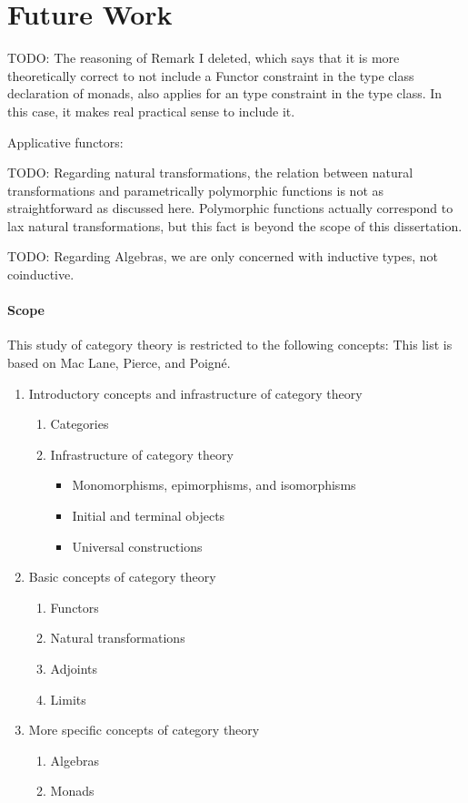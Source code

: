 \section{Future Work}

TODO: The reasoning of Remark I deleted, which says that it is more
theoretically correct to not include a Functor constraint in the type
class declaration of monads, also applies for an
 type constraint in the 
type class. In this case, it makes real practical sense to include
it.

Applicative functors: \parencite{mcbride-paterson-2008}

TODO: Regarding natural transformations, the relation between natural
transformations and parametrically polymorphic functions is not as
straightforward as discussed here. Polymorphic functions actually
correspond to lax natural transformations, but this fact is beyond the
scope of this dissertation.

TODO: Regarding Algebras, we are only concerned with inductive types,
not coinductive.

\paragraph{Scope}

This study of category theory is restricted to the following concepts:
This list is based on Mac Lane, Pierce, and Poigné.

\begin{enumerate}
\item Introductory concepts and infrastructure of category theory
  \begin{enumerate}
  \item Categories
  \item Infrastructure of category theory
    \begin{itemize}
    \item Monomorphisms, epimorphisms, and isomorphisms
    \item Initial and terminal objects
    \item Universal constructions
    \end{itemize}
  \end{enumerate}
\item Basic concepts of category theory
  \begin{enumerate}
  \item Functors
  \item Natural transformations
  \item Adjoints
  \item Limits
  \end{enumerate}
\item More specific concepts of category theory
  \begin{enumerate}
  \item Algebras
  \item Monads
  \end{enumerate}
\end{enumerate}

\clearemptydoublepage
